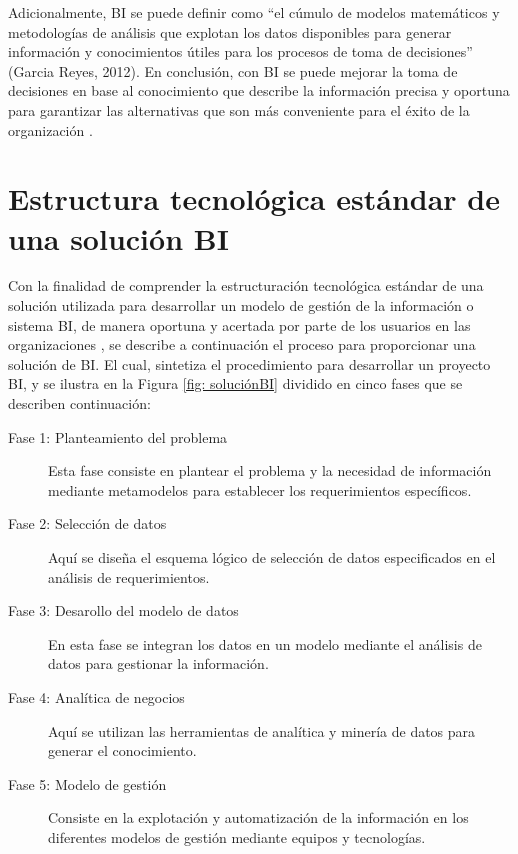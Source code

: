 \documentclass[11pt,titlepage]{report}
\begin{document}
Adicionalmente, BI se puede definir como “el cúmulo de modelos matemáticos y metodologías de análisis que explotan los datos disponibles para generar información y conocimientos útiles para los procesos de toma de decisiones” (Garcia Reyes, 2012). En conclusión, con BI se puede mejorar la toma de decisiones en base al conocimiento que describe la información precisa y oportuna para garantizar las alternativas que son más conveniente para el éxito de la organización \cite{tes02}.


\section{Estructura tecnológica estándar de una solución BI}

Con la finalidad de comprender la estructuración tecnológica estándar de una solución utilizada para desarrollar un modelo de gestión de la información o sistema BI, de manera oportuna y acertada por parte de los usuarios en las organizaciones \cite{web07}, se describe a continuación el proceso para proporcionar una solución de BI. El cual, sintetiza el procedimiento para desarrollar un proyecto BI, y se ilustra en la Figura \ref{fig: soluciónBI} dividido en cinco fases que se describen continuación:

\begin{description}
\item[Fase 1: Planteamiento del problema]  Esta fase consiste en plantear el problema y la necesidad de información mediante metamodelos para establecer los requerimientos específicos.

\item[Fase 2: Selección de datos] Aquí se diseña el esquema lógico de selección de datos especificados en el análisis de requerimientos.

\item[Fase 3: Desarollo del modelo de datos] En esta fase se integran los datos en un modelo mediante el análisis de datos para gestionar la información.

\item[Fase 4: Analítica de negocios] Aquí se utilizan las herramientas de analítica y minería de datos para generar el conocimiento.

\item[Fase 5: Modelo de gestión] Consiste en la explotación y automatización de la información en los diferentes modelos de gestión mediante equipos y tecnologías.

\end{description}
\end{document}
